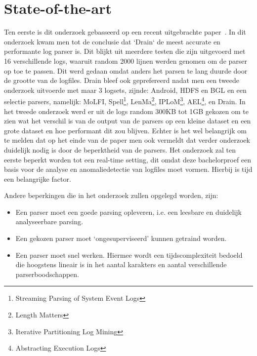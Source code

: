 
\section{State-of-the-art}
\label{sec:state-of-the-art}
Ten eerste is dit onderzoek gebasseerd op een recent uitgebrachte paper~\autocite{TBA2019}. In dit onderzoek kwam men tot de conclusie dat `Drain` de meest accurate en performante log parser is. Dit blijkt uit meerdere testen die zijn uitgevoerd met 16 verschillende logs, waaruit random 2000 lijnen werden genomen om de parser op toe te passen. Dit werd gedaan omdat anders het parsen te lang duurde door de grootte van de logfiles. Drain bleef ook geprefereerd nadat men een tweede onderzoek uitvoerde met maar 3 logsets, zijnde: Android, HDFS en BGL en een selectie parsers, namelijk: MoLFI\autocite{messaoudi2018search}, Spell\footnote{Streaming Parsing of System Event Logs}\autocite{du2016spell}, LenMa\footnote{Length Matters}\autocite{shima2016length}, IPLoM\footnote{Iterative Partitioning Log Mining}\autocite{makanju2009clustering}, AEL\footnote{Abstracting Execution Logs}\autocite{jiang2008abstracting}, en Drain\autocite{he2017drain}. In het tweede onderzoek werd er uit de logs random 300KB tot 1GB gekozen om te zien wat het verschil is van de output van de parsers op een kleine dataset en een grote dataset en hoe performant dit zou blijven.
Echter is het wel belangrijk om te melden dat op het einde van de paper men ook vermeldt dat verder onderzoek duidelijk nodig is door de beperktheid van de parsers.
Het onderzoek zal ten eerste beperkt worden tot een real-time setting, dit omdat deze bachelorproef een basis voor de analyse en anomaliedetectie van logfiles moet vormen. Hierbij is tijd een belangrijke factor. 

Andere beperkingen die in het onderzoek zullen opgelegd worden, zijn:
\begin{itemize}
    \item Een parser moet een goede parsing opleveren, i.e. een leesbare en duidelijk analyseerbare parsing.
    \item Een gekozen parser moet ‘ongesuperviseerd’ kunnen getraind worden.
    \item Een parser moet snel werken. Hiermee wordt een tijdscomplexiteit bedoeld die hoogstens lineair is in het aantal karakters en aantal verschillende parserboodschappen.
\end{itemize}

